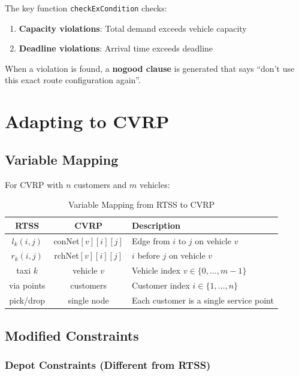 \documentclass[12pt,a4paper]{article}
\theoremstyle{definition}
\begin{document}
The key function \texttt{checkExCondition} checks:
\begin{enumerate}
    \item \textbf{Capacity violations}: Total demand exceeds vehicle capacity
    \item \textbf{Deadline violations}: Arrival time exceeds deadline
\end{enumerate}

When a violation is found, a \textbf{nogood clause} is generated that says ``don't use this exact route configuration again''.

\section{Adapting to CVRP}

\subsection{Variable Mapping}

For CVRP with $n$ customers and $m$ vehicles:

\begin{table}[H]
\centering
\begin{tabular}{|c|c|p{7cm}|}
\hline
\textbf{RTSS} & \textbf{CVRP} & \textbf{Description} \\
\hline
$l_k(i,j)$ & conNet$[v][i][j]$ & Edge from $i$ to $j$ on vehicle $v$ \\
\hline
$r_k(i,j)$ & rchNet$[v][i][j]$ & $i$ before $j$ on vehicle $v$ \\
\hline
taxi $k$ & vehicle $v$ & Vehicle index $v \in \{0, \ldots, m-1\}$ \\
\hline
via points & customers & Customer index $i \in \{1, \ldots, n\}$ \\
\hline
pick/drop & single node & Each customer is a single service point \\
\hline
\end{tabular}
\caption{Variable Mapping from RTSS to CVRP}
\end{table}

\subsection{Modified Constraints}

\subsubsection{Depot Constraints (Different from RTSS)}
\end{document}
